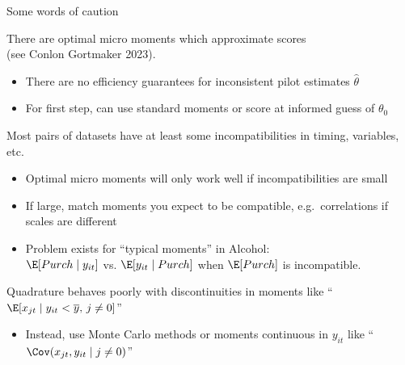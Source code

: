 \begin{frame}{Some words of caution}
    
    \begin{wideitemize}
    \item There are \alert{optimal micro moments} which approximate scores\\ (see Conlon Gortmaker 2023).
        \begin{itemize}
            \item There are no efficiency guarantees for \alert{inconsistent} pilot estimates $\hat{\theta}$
            \item For first step, can use standard moments or score at informed guess of $\theta_0$
        \end{itemize}
        
        \item Most pairs of datasets have at least some  \alert{incompatibilities} in timing, variables, etc.
        \begin{itemize}
            \item Optimal micro moments will only work well if incompatibilities are small
            \item If large, match moments you expect to be compatible, e.g.\ correlations if scales are different
            \item Problem exists for ``typical moments'' in Alcohol:\\
             $\E[Purch \mid  y_{it}]$ vs. $\E[y_{it} \mid Purch]$ when $\E[Purch]$ is \alert{incompatible}.
        \end{itemize}
    
        \item Quadrature behaves poorly with \alert{discontinuities} in moments like ``$\E[x_{jt} \mid y_{it} < \overline{y}, \, j \neq 0]$''
        \begin{itemize}
            \item Instead, use Monte Carlo methods or moments continuous in $y_{it}$ like ``$\Cov(x_{jt}, y_{it} \mid j \neq 0)$''
        \end{itemize}
    \end{wideitemize}
\end{frame}



